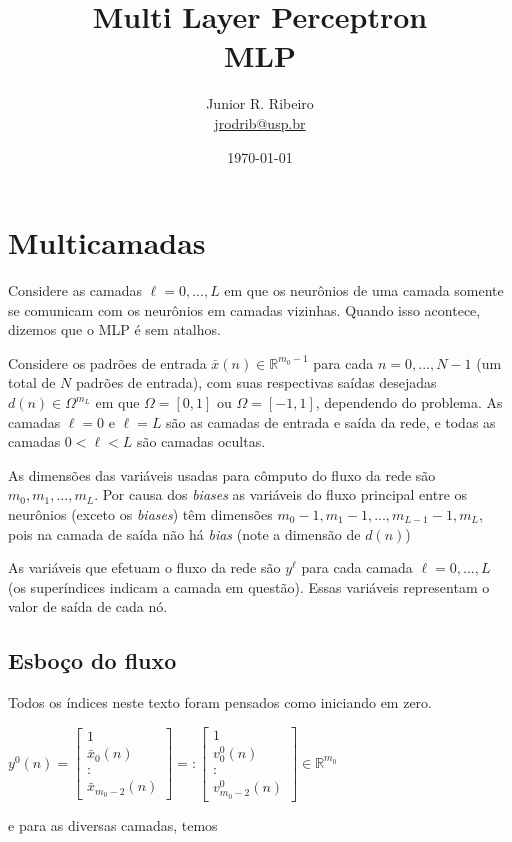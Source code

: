 \documentclass[12pt,a4paper]{article}
\title{Multi Layer Perceptron\\MLP}
\author{Junior R. Ribeiro \\ \url{jrodrib@usp.br}}
\date{\today}
\def\RR{\mathbb{R}}
\begin{document}
\maketitle\tableofcontents

\section{Multicamadas}

Considere as camadas $\ell=0,...,L$ em que os neurônios de uma camada somente se comunicam com os neurônios em camadas vizinhas. Quando isso acontece, dizemos que o MLP é sem atalhos.

Considere os padrões de entrada $\bar x(n)\in\RR^{m_0-1}$ para cada $n=0,...,N-1$ (um total de $N$ padrões de entrada), com suas respectivas saídas desejadas $d(n)\in\Omega^{m_L}$ em que $\Omega=[0,1]$ ou $\Omega=[-1,1]$, dependendo do problema. As camadas $\ell=0$ e $\ell=L$ são as camadas de entrada e saída da rede, e todas as camadas $0<\ell<L$ são camadas ocultas.

As dimensões das variáveis usadas para cômputo do fluxo da rede são $m_0, m_1,...,m_L$. Por causa dos \textit{biases} as variáveis do fluxo principal entre os neurônios (exceto os \textit{biases}) têm dimensões $m_0-1, m_1-1,...,m_{L-1}-1,m_L$, pois na camada de saída não há \textit{bias} (note a dimensão de $d(n)$)

As variáveis que efetuam o fluxo da rede são $y^\ell$ para cada camada $\ell=0,...,L$ (os superíndices indicam a camada em questão). Essas variáveis representam o valor de saída de cada nó.

\subsection{Esboço do fluxo}
Todos os índices neste texto foram pensados como iniciando em zero.

$
y^0(n) = \begin{bmatrix}
1\\
\bar x_0(n)\\
:\\
\bar x_{m_0-2}(n)
\end{bmatrix}
=:
\begin{bmatrix}
	1\\
	v_0^0(n)\\
	:\\
	v_{m_0-2}^0(n)
\end{bmatrix}
\in \RR^{m_0}
$

\noindent e para as diversas camadas, temos
\end{document}
